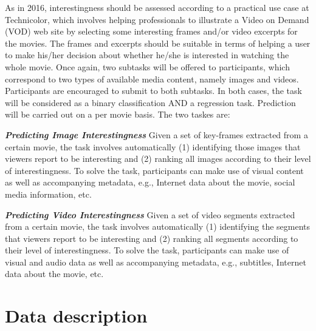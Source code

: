\documentclass[sigconf]{acmart-me}
\begin{document}
As in 2016, interestingness should be assessed according to a practical use case at Technicolor, which involves helping professionals to illustrate a Video on Demand (VOD) web site by selecting some interesting frames and/or video excerpts for the movies. The frames and excerpts should be suitable in terms of helping a user to make his/her decision about whether he/she is interested in watching the whole movie.
Once again, two subtasks will be offered to participants, which correspond to two types of available media content, namely images and videos. Participants are encouraged to submit to both subtasks. In both cases, the task will be considered as a binary classification AND a regression task. Prediction will be carried out on a per movie basis.
The two taskes are:

\emph{\bf Predicting Image Interestingness} Given a set of key-frames extracted from a certain movie, the task involves automatically (1) identifying those images that viewers report to be interesting and (2) ranking all images according to their level of interestingness. To solve the task, participants can make use of visual content as well as accompanying metadata, e.g., Internet data about the movie, social media information, etc.

\emph{\bf Predicting Video Interestingness} Given a set of video segments extracted from a certain movie, the task involves automatically (1) identifying the segments that viewers report to be interesting and (2) ranking all segments according to their level of interestingness. To solve the task, participants can make use of visual and audio data as well as accompanying metadata, e.g., subtitles, Internet data about the movie, etc.

\vspace{-0.2cm}
\section{Data description}
\end{document}
